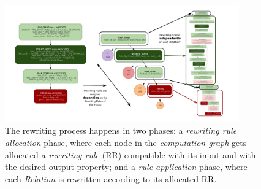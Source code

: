 \documentclass[letterpaper]{article} %
\begin{document}
\begin{figure}[t]
    \centering
    \includegraphics[width=0.9\textwidth]{figures/rewriting} %
    \caption{The rewriting process happens in two phases: a \emph{rewriting rule allocation} phase, where each node in the \emph{computation graph} gets allocated a \emph{rewriting rule} (RR) compatible with its input and with the desired output property; and a \emph{rule application} phase, where each \emph{Relation} is rewritten according to its allocated RR.}
    \label{fig:rewriting}
\end{figure}
\end{document}
